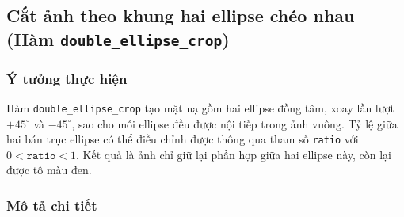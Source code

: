 \subsection{Cắt ảnh theo khung hai ellipse chéo nhau (Hàm \texttt{double\_ellipse\_crop})}

\subsubsection*{Ý tưởng thực hiện}

Hàm \texttt{double\_ellipse\_crop} tạo mặt nạ gồm hai ellipse đồng tâm, xoay lần lượt $+45^\circ$ và $-45^\circ$, sao cho mỗi ellipse đều được nội tiếp trong ảnh vuông. Tỷ lệ giữa hai bán trục ellipse có thể điều chỉnh được thông qua tham số \texttt{ratio} với $0 < \texttt{ratio} < 1$. Kết quả là ảnh chỉ giữ lại phần hợp giữa hai ellipse này, còn lại được tô màu đen.

\subsubsection*{Mô tả chi tiết}

